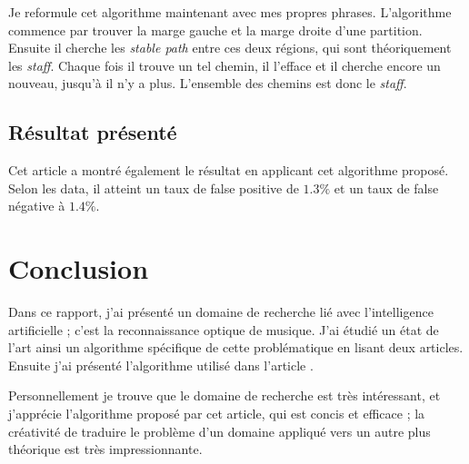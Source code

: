 \documentclass{article}
\begin{document}
\par Je reformule cet algorithme maintenant avec mes propres phrases. L'algorithme commence par trouver la marge gauche et la marge droite d'une partition. Ensuite il cherche les \textit{stable path} entre ces deux régions, qui sont théoriquement les \textit{staff}. Chaque fois il trouve un tel chemin, il l'efface et il cherche encore un nouveau, jusqu'à il n'y a plus. L'ensemble des chemins est donc le \textit{staff}.

\subsection{Résultat présenté}
\par Cet article a montré également le résultat en applicant cet algorithme proposé. Selon les data, il atteint un taux de false positive de $1.3\%$ et un taux de false négative à $1.4\%$.

\section{Conclusion}
\par Dans ce rapport, j'ai présenté un domaine de recherche lié avec l'intelligence artificielle ; c'est la reconnaissance optique de musique. J'ai étudié un état de l'art ainsi un algorithme spécifique de cette problématique en lisant deux articles\cite{dos2009staff}\cite{shatri2020optical}. Ensuite j'ai présenté l'algorithme utilisé dans l'article \cite{dos2009staff}.

\par Personnellement je trouve que le domaine de recherche est très intéressant, et j'apprécie l'algorithme proposé par cet article, qui est concis et efficace ; la créativité de traduire le problème d'un domaine appliqué vers un autre plus théorique est très impressionnante. 

\newpage


\end{document}
